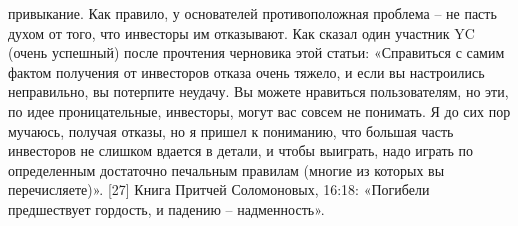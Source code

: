 \documentclass[ebook,12pt,oneside,openany]{memoir}
\begin{document}
привыкание. Как правило, у основателей противоположная проблема – не
пасть духом от того, что инвесторы им отказывают. Как сказал один
участник YC (очень успешный) после прочтения черновика этой статьи:
«Справиться с самим фактом получения от инвесторов отказа очень
тяжело, и если вы настроились неправильно, вы потерпите неудачу. Вы
можете нравиться пользователям, но эти, по идее проницательные,
инвесторы, могут вас совсем не понимать. Я до сих пор мучаюсь, получая
отказы, но я пришел к пониманию, что большая часть инвесторов не
слишком вдается в детали, и чтобы выиграть, надо играть по
определенным достаточно печальным правилам (многие из которых вы
перечисляете)». [27] Книга Притчей Соломоновых, 16:18: «Погибели
предшествует гордость, и падению – надменность».
\end{document}
